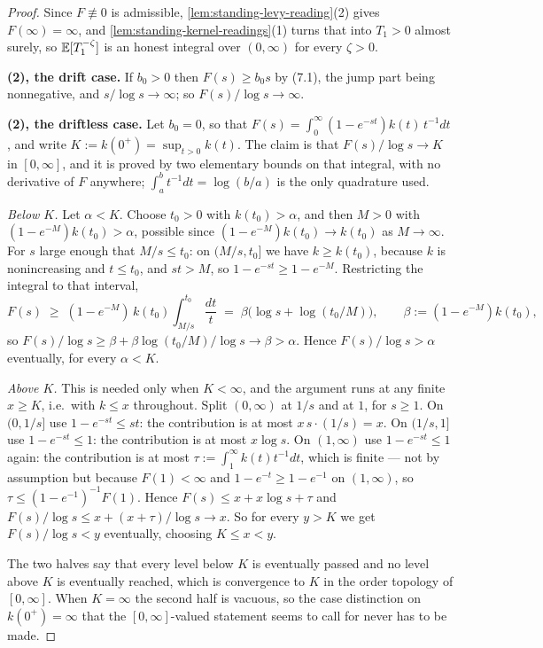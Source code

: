 \begin{proof}
\leanok
Since $F \not\equiv 0$ is admissible, \ref{lem:standing-levy-reading}(2) gives
$F(\infty) = \infty$, and \ref{lem:standing-kernel-readings}(1) turns that into $T_1 > 0$ almost
surely, so $\mathbb{E}[T_1^{-\zeta}]$ is an honest integral over $(0,\infty)$ for every $\zeta > 0$.

\textbf{(2), the drift case.} If $b_0 > 0$ then $F(s) \ge b_0 s$ by (7.1), the jump part being
nonnegative, and $s/\log s \to \infty$; so $F(s)/\log s \to \infty$.

\textbf{(2), the driftless case.} Let $b_0 = 0$, so that
$F(s) = \int_0^\infty (1 - e^{-st})k(t)\,t^{-1}dt$, and write $K := k(0^+) = \sup_{t>0}k(t)$. The
claim is that $F(s)/\log s \to K$ in $[0,\infty]$, and it is proved by two elementary bounds on
that integral, with no derivative of $F$ anywhere; $\int_a^b t^{-1}dt = \log(b/a)$ is the only
quadrature used.

\emph{Below $K$.} Let $\alpha < K$. Choose $t_0 > 0$ with $k(t_0) > \alpha$, and then $M > 0$ with
$(1 - e^{-M})k(t_0) > \alpha$, possible since $(1-e^{-M})k(t_0) \to k(t_0)$ as $M \to \infty$. For
$s$ large
enough that $M/s \le t_0$: on $(M/s, t_0]$ we have $k \ge k(t_0)$, because $k$ is nonincreasing and
$t \le t_0$, and $st > M$, so $1 - e^{-st} \ge 1 - e^{-M}$. Restricting the integral to that
interval,
\[
  F(s) \;\ge\; (1 - e^{-M})\,k(t_0)\int_{M/s}^{t_0}\frac{dt}{t}
        \;=\; \beta\bigl(\log s + \log(t_0/M)\bigr),
  \qquad \beta := (1-e^{-M})k(t_0),
\]
so $F(s)/\log s \ge \beta + \beta\log(t_0/M)/\log s \to \beta > \alpha$. Hence
$F(s)/\log s > \alpha$ eventually, for every $\alpha < K$.

\emph{Above $K$.} This is needed only when $K < \infty$, and the argument runs at any finite
$x \ge K$, i.e.\ with $k \le x$ throughout. Split $(0,\infty)$ at $1/s$ and at $1$, for $s \ge 1$.
On $(0,1/s]$ use $1 - e^{-st} \le st$: the contribution is at most $x\,s\cdot(1/s) = x$. On
$(1/s, 1]$ use $1 - e^{-st} \le 1$: the contribution is at most $x\log s$. On $(1,\infty)$ use
$1 - e^{-st} \le 1$ again: the contribution is at most $\tau := \int_1^\infty k(t)t^{-1}dt$, which
is finite --- not by assumption but because $F(1) < \infty$ and $1 - e^{-t} \ge 1 - e^{-1}$ on
$(1,\infty)$, so $\tau \le (1-e^{-1})^{-1}F(1)$. Hence $F(s) \le x + x\log s + \tau$ and
$F(s)/\log s \le x + (x+\tau)/\log s \to x$. So for every $y > K$ we get $F(s)/\log s < y$
eventually, choosing $K \le x < y$.

The two halves say that every level below $K$ is eventually passed and no level above $K$ is
eventually reached, which is convergence to $K$ in the order topology of $[0,\infty]$. When
$K = \infty$ the second half is vacuous, so the case distinction on $k(0^+) = \infty$ that the
$[0,\infty]$-valued statement seems to call for never has to be made.


\end{proof}
